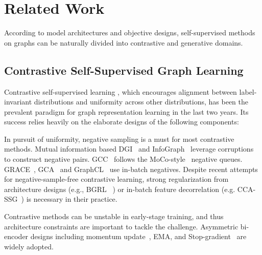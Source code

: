 \section{Related Work}%
\label{sec:related}
According to model architectures and objective designs, self-supervised methods on graphs can be naturally divided into contrastive and generative domains. 


\subsection{Contrastive Self-Supervised Graph Learning}
Contrastive self-supervised learning
, which encourages alignment between label-invariant distributions and uniformity across other distributions, 
has been the prevalent paradigm for graph representation learning in the last two years. 
Its success relies heavily 
on the elaborate designs of the following components:

In pursuit of uniformity, negative sampling is a must for most contrastive methods. 
Mutual information based DGI~\cite{velivckovic2018deep} and InfoGraph~\cite{sun2019infograph} leverage corruptions to construct negative pairs.
GCC~\cite{qiu2020gcc} follows the MoCo-style~\cite{he2020momentum} negative queues. 
GRACE~\cite{zhu2020deep}, GCA~\cite{zhu2021graph} and GraphCL~\cite{you2020graph} use in-batch negatives. 
Despite recent attempts for negative-sample-free contrastive learning, strong regularization from architecture designs (e.g., BGRL ~\cite{thakoor2021bootstrapped}) or 
in-batch feature decorrelation
(e.g. CCA-SSG~\cite{zhang2021canonical}) is necessary in their practice.

Contrastive methods can be unstable in early-stage training, and thus architecture constraints are important to tackle the challenge. 
Asymmetric bi-encoder designs including momentum update~\cite{qiu2020gcc}, EMA, and Stop-gradient~\cite{thakoor2021bootstrapped} are widely adopted.

